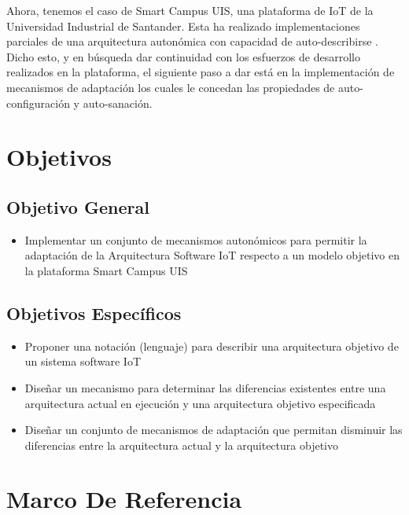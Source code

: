 \documentclass[12pt]{article}
\begin{document}
    Ahora, tenemos el caso de Smart Campus UIS, una plataforma de IoT de la Universidad Industrial de Santander. Esta ha realizado implementaciones parciales de una arquitectura autonómica con capacidad de auto-describirse \cite{henry_2020}. Dicho esto, y en búsqueda dar continuidad con los esfuerzos de desarrollo realizados en la plataforma, el siguiente paso a dar está en la implementación de mecanismos de adaptación los cuales le concedan las propiedades de auto-configuración y auto-sanación.

    \section{Objetivos}
    \subsection{Objetivo General}
    \begin{itemize}

        \item Implementar un conjunto de mecanismos autonómicos para permitir la adaptación de la Arquitectura Software IoT respecto a un modelo objetivo en la plataforma Smart Campus UIS

    \end{itemize}

    \subsection{Objetivos Específicos}

    \begin{itemize}
        \item Proponer una notación (lenguaje) para describir una arquitectura objetivo de un sistema software IoT
        \item Diseñar un mecanismo para determinar las diferencias existentes entre una arquitectura actual en ejecución y una arquitectura objetivo especificada
        \item Diseñar un conjunto de mecanismos de adaptación que permitan disminuir las diferencias entre la arquitectura actual y la arquitectura objetivo

    \end{itemize}

    \section{Marco De Referencia}
\end{document}
